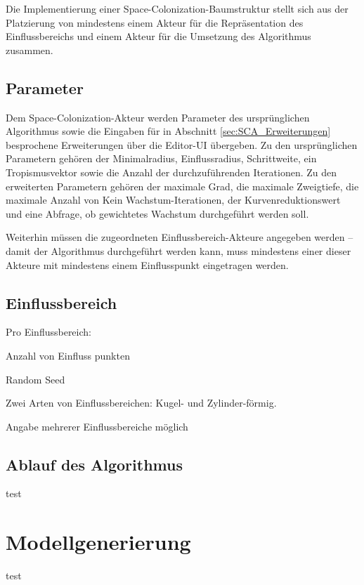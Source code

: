 Die Implementierung einer Space-Colonization-Baumstruktur stellt sich aus der Platzierung von mindestens einem Akteur für die Repräsentation des Einflussbereichs und einem Akteur für die Umsetzung des Algorithmus zusammen.

\subsection{Parameter}

Dem Space-Colonization-Akteur werden Parameter des ursprünglichen Algorithmus sowie die Eingaben für in Abschnitt \ref{sec:SCA_Erweiterungen} besprochene Erweiterungen über die Editor-UI übergeben. Zu den ursprünglichen Parametern gehören der Minimalradius, Einflussradius, Schrittweite, ein Tropismusvektor sowie die Anzahl der durchzuführenden Iterationen. Zu den erweiterten Parametern gehören der maximale Grad, die maximale Zweigtiefe, die maximale Anzahl von \glqq Kein Wachstum\grqq{}-Iterationen, der Kurvenreduktionswert und eine Abfrage, ob gewichtetes Wachstum durchgeführt werden soll.

Weiterhin müssen die zugeordneten Einflussbereich-Akteure angegeben werden -- damit der Algorithmus durchgeführt werden kann, muss mindestens einer dieser Akteure mit mindestens einem Einflusspunkt eingetragen werden.

\subsection{Einflussbereich}



Pro Einflussbereich:

Anzahl von Einfluss punkten

Random Seed

Zwei Arten von Einflussbereichen: Kugel- und Zylinder-förmig.

Angabe mehrerer Einflussbereiche möglich


\subsection{Ablauf des Algorithmus}

test

\section{Modellgenerierung} \label{sec:Modellgenerierung}

test

